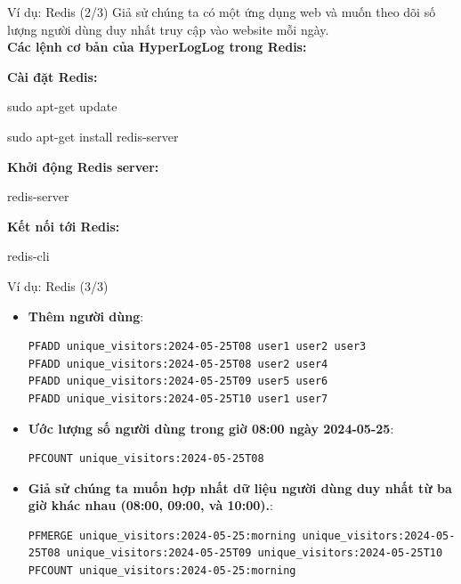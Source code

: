 \documentclass[10pt]{beamer}
\newcommand{\SubItem}[1]{
    {\setlength\itemindent{15pt} \item[-] #1}
}
\begin{document}
\begin{frame}{Ví dụ: Redis (2/3)}
Giả sử chúng ta có một ứng dụng web và muốn theo dõi số lượng người dùng duy nhất truy cập vào website mỗi ngày.\\
\textbf{Các lệnh cơ bản của HyperLogLog trong Redis:}
  \begin{itemize}
    \item \textbf{Cài đặt Redis:} 
   	\SubItem{sudo apt-get update}
   	\SubItem{sudo apt-get install redis-server}
    \item \textbf{Khởi động Redis server:} 
    \SubItem{redis-server}   
    \item \textbf{Kết nối tới Redis:}
    \SubItem{redis-cli}
   \end{itemize}
\end{frame}

\begin{frame}[fragile]{Ví dụ: Redis (3/3)}
\begin{itemize}
	\item \textbf{Thêm người dùng}:
	\begin{lstlisting}
PFADD unique_visitors:2024-05-25T08 user1 user2 user3
PFADD unique_visitors:2024-05-25T08 user2 user4
PFADD unique_visitors:2024-05-25T09 user5 user6
PFADD unique_visitors:2024-05-25T10 user1 user7
\end{lstlisting}
\item \textbf{Ước lượng số người dùng trong giờ 08:00 ngày 2024-05-25}:
	\begin{lstlisting}
PFCOUNT unique_visitors:2024-05-25T08
\end{lstlisting}
\item \textbf{Giả sử chúng ta muốn hợp nhất dữ liệu người dùng duy nhất từ ba giờ khác nhau (08:00, 09:00, và 10:00).}:
	\begin{lstlisting}
PFMERGE unique_visitors:2024-05-25:morning unique_visitors:2024-05-25T08 unique_visitors:2024-05-25T09 unique_visitors:2024-05-25T10
PFCOUNT unique_visitors:2024-05-25:morning
\end{lstlisting}
\end{itemize}
\end{frame}
\end{document}

